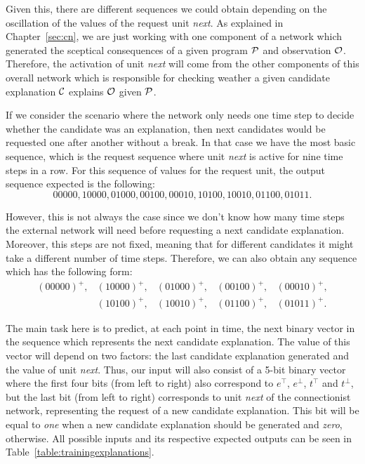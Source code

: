 Given this, there are different sequences we could obtain depending on the oscillation of the values of the request unit \textit{next}. As explained in Chapter~\ref{sec:cn}, we are just working with one component of a network which generated the sceptical consequences of a given program $\mathcal{P}$ and observation $\mathcal{O}$. Therefore, the activation of unit \textit{next} will come from the other components of this overall network which is responsible for checking weather a given candidate explanation $\mathcal{C}$ explains $\mathcal{O}$ given $\mathcal{P}$.

If we consider the scenario where the network only needs one time step to decide whether the candidate was an explanation, then next candidates would be requested one after another without a break. In that case we have the most basic sequence, which is the request sequence where unit \textit{next} is active for nine time steps in a row. For this sequence of values for the request unit, the output sequence expected is the following: 
\[
00000, 10000, 01000, 00100, 00010, 10100, 10010, 01100, 01011.
\]

However, this is not always the case since we don't know how many time steps the external network will need before requesting a next candidate explanation. Moreover, this steps are not fixed, meaning that for different candidates it might take a different number of time steps. Therefore, we can also obtain any sequence which has the following form: 
\[
\begin{array}{lllll}
(00000)^+,&(10000)^+, &(01000)^+, &(00100)^+, &(00010)^+,\\
	        &(10100)^+, &(10010)^+, &(01100)^+, &(01011)^+.
\end{array}
\]

The main task here is to predict, at each point in time, the next binary vector in the sequence which represents the next candidate explanation. The value of this vector will depend on two factors: the last candidate explanation generated and the value of unit \textit{next}. Thus, our input will also consist of a 5-bit binary vector where the first four bits (from left to right) also correspond to $e^\top$, $e^\bot$, $t^\top$ and $t^\bot$, but the last bit (from left to right) corresponds to unit \textit{next} of the connectionist network, representing the request of a new candidate explanation. This bit will be equal to \textit{one} when a new candidate explanation should be generated and \textit{zero}, otherwise. All possible inputs and its respective expected outputs can be seen in Table~\ref{table:trainingexplanations}.

